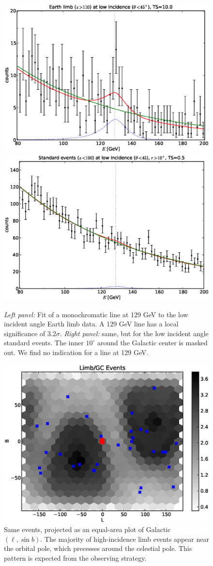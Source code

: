 \documentclass[aps,twocolumn,prd,superscriptaddress,showpacs,nofootinbib,fixfloat]{revtex4}
\begin{document}
\begin{figure}[p]
  \centering
  \includegraphics[width=0.48\linewidth]{plots/albedo_line_thetaCut.eps}
  \includegraphics[width=0.48\linewidth]{plots/noalbedo_line_thetaCut.eps}
  \caption{\emph{Left panel:} Fit of a monochromatic line at 129 GeV to the
  low incident angle Earth limb data. A 129 GeV line has a local significance of
  3.2$\sigma$.  \emph{Right panel:} same, but for the low incident angle
  standard events. The inner $10^\circ$ around the Galactic center is masked
  out. We find no indication for a line at 129 GeV.}
  \label{fig:albedoline}
\end{figure}

\begin{figure}[p]
  \centering
  \includegraphics[width=1.0\linewidth]{plots/limb_l_b.eps}
  \caption{Same events, projected as an equal-area plot of Galactic $(\ell,
  \sin b)$.  The majority of high-incidence limb events appear near the
  orbital pole, which precesses around the celestial pole.  This pattern is
  expected from the observing strategy.}
  \label{fig:l-b}
\end{figure}
\end{document}
